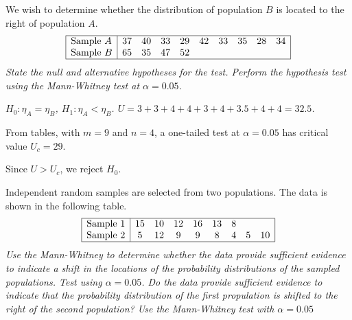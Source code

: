 \begin{exercise}
\begin{questions}

\question
We wish to determine whether the distribution of population $B$ is located to the right of population $A$.
\[\begin{array}{|l|ccccccccc|}\hline
\text{Sample $A$} & 37 & 40 & 33 & 29 & 42 & 33 & 35 & 28 & 34 \\
\text{Sample $B$} & 65 & 35 & 47 & 52 & & & & & \\ \hline
\end{array}\]
\ben
\it State the null and alternative hypotheses for the test.
\it Perform the hypothesis test using the Mann-Whitney test at $\alpha=0.05$.
\een
\begin{answer}
\ben
\it %
$H_0:\eta_A=\eta_B$, $H_1:\eta_A<\eta_B$.
\it %
$U = 3 + 3 + 4 + 4 + 3 + 4 + 3.5 + 4 + 4 = 32.5$. 
\par
From tables, with $m=9$ and $n=4$, a one-tailed test at $\alpha=0.05$ has critical value $U_c = 29$. 
\par
Since $U>U_c$, we reject $H_0$.
\een
\end{answer}

\question
Independent random samples are selected from two populations. The data is shown in the following table.
\[\begin{array}{|l|cccccccc|}\hline
\text{Sample $1$} & 15 & 10 & 12 & 16 & 13 &  8 &    & 		\\
\text{Sample $2$} &  5 & 12 &  9 &  9 &  8 &  4 &  5 & 10 	\\ \hline
\end{array}\]
\ben
\it Use the Mann-Whitney to determine whether the data provide sufficient evidence to indicate a shift in the locations of the probability distributions of the sampled populations. Test using $\alpha=0.05$.
\it Do the data provide sufficient evidence to indicate that the probability distribution of the first propulation is shifted to the right of the second population? Use the Mann-Whitney test with $\alpha=0.05$
\een


\end{questions}
\end{exercise}
